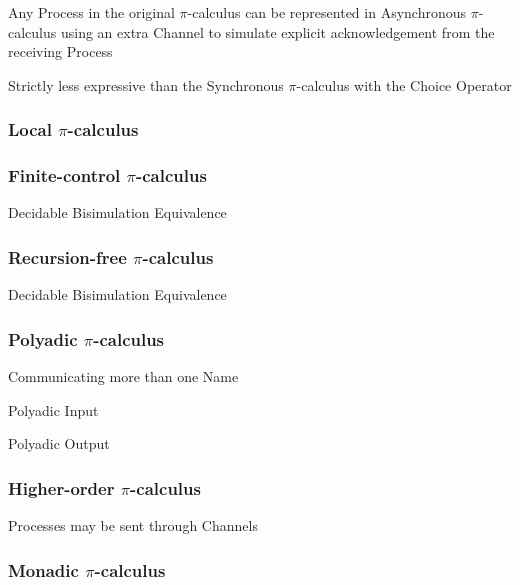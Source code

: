 Any Process in the original $\pi$-calculus can be represented in
Asynchronous $\pi$-calculus using an extra Channel to simulate explicit
acknowledgement from the receiving Process

Strictly less expressive than the Synchronous $\pi$-calculus with the
Choice Operator



\subsubsection{Local $\pi$-calculus}\label{sec:local_pi_calculus}

\subsubsection{Finite-control $\pi$-calculus}
\label{sec:finitecontrol_pi_calculus}

Decidable Bisimulation Equivalence



\subsubsection{Recursion-free $\pi$-calculus}
\label{sec:recursionfree_pi_calculus}

Decidable Bisimulation Equivalence



\subsubsection{Polyadic $\pi$-calculus}\label{sec:polyadic_pi_calculus}

Communicating more than one Name

Polyadic Input

Polyadic Output



\subsubsection{Higher-order $\pi$-calculus}
\label{sec:higherorder_pi_calculus}

Processes may be sent through Channels



\subsubsection{Monadic $\pi$-calculus}\label{sec:monadic_pi_calculus}

